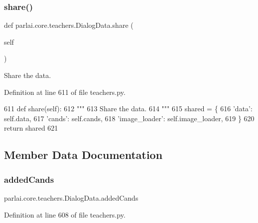 \subsubsection{\texorpdfstring{share()}{share()}}
{\footnotesize\ttfamily def parlai.\+core.\+teachers.\+Dialog\+Data.\+share (\begin{DoxyParamCaption}\item[{}]{self }\end{DoxyParamCaption})}

\begin{DoxyVerb}Share the data.
\end{DoxyVerb}
 

Definition at line 611 of file teachers.\+py.


\begin{DoxyCode}
611     \textcolor{keyword}{def }share(self):
612         \textcolor{stringliteral}{"""}
613 \textcolor{stringliteral}{        Share the data.}
614 \textcolor{stringliteral}{        """}
615         shared = \{
616             \textcolor{stringliteral}{'data'}: self.data,
617             \textcolor{stringliteral}{'cands'}: self.cands,
618             \textcolor{stringliteral}{'image\_loader'}: self.image\_loader,
619         \}
620         \textcolor{keywordflow}{return} shared
621 
\end{DoxyCode}


\subsection{Member Data Documentation}
\mbox{\label{classparlai_1_1core_1_1teachers_1_1DialogData_aee61e6bc9e80fe0443a7f5322c4ae08d}} 
\subsubsection{\texorpdfstring{added\+Cands}{addedCands}}
{\footnotesize\ttfamily parlai.\+core.\+teachers.\+Dialog\+Data.\+added\+Cands}



Definition at line 608 of file teachers.\+py.

\mbox{\label{classparlai_1_1core_1_1teachers_1_1DialogData_a21822d2d86e26a27bdc8326b48ebc9b9}} 
